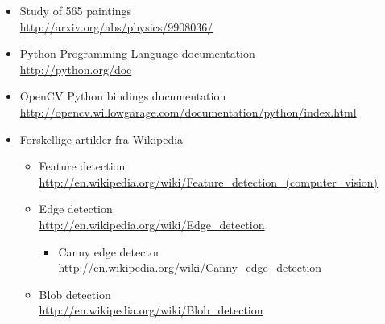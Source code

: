 \begin{itemize}
	\item Study of 565 paintings\\
		\href{http://arxiv.org/abs/physics/9908036/}{http://arxiv.org/abs/physics/9908036/}
	\item Python Programming Language documentation\\
		\href{http://python.org/doc}{http://python.org/doc}
	\item OpenCV Python bindings ducumentation\\
		\href{http://opencv.willowgarage.com/documentation/python/index.html}{http://opencv.willowgarage.com/documentation/python/index.html}
	\item Forskellige artikler fra Wikipedia\\
		\begin{itemize}
			\item Feature detection\\
				\href{http://en.wikipedia.org/wiki/Feature\_detection\_(computer\_vision)}{http://en.wikipedia.org/wiki/Feature\_detection\_(computer\_vision)}\\
			\item Edge detection\\
				\href{http://en.wikipedia.org/wiki/Edge\_detection}{http://en.wikipedia.org/wiki/Edge\_detection}
					\begin{itemize}
						\item Canny edge detector\\
							\href{http://en.wikipedia.org/wiki/Canny\_edge\_detection}{http://en.wikipedia.org/wiki/Canny\_edge\_detection}
					\end{itemize}
			\item Blob detection\\
				\href{http://en.wikipedia.org/wiki/Blob\_detection}{http://en.wikipedia.org/wiki/Blob\_detection}
		\end{itemize}
\end{itemize}
